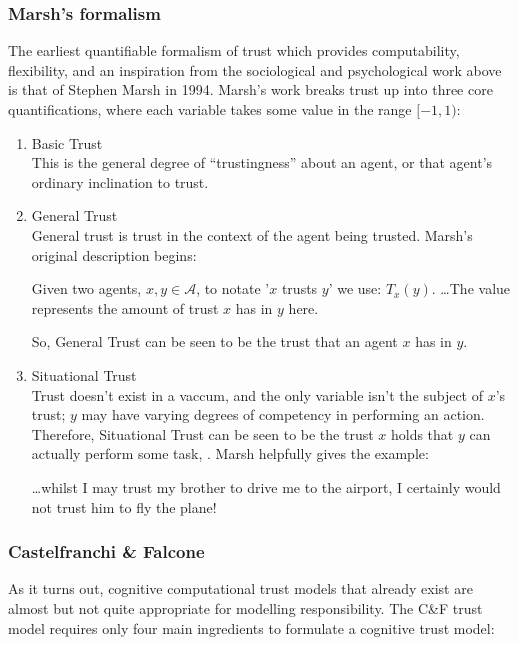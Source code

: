 \subsubsection{Marsh's formalism}
The earliest quantifiable formalism of trust which provides computability, flexibility, and an inspiration from the sociological and psychological work above is that of Stephen Marsh in 1994\cite{Marsh1994FormalisingConcept}. Marsh's work breaks trust up into three core quantifications, where each variable takes some value in the range \({[-1,1)}\):
\begin{enumerate}
    \item Basic Trust \\
    This is the general degree of ``trustingness'' about an agent, or that agent's ordinary inclination to trust.
    \item General Trust \\
    General trust is trust in the context of the agent being trusted. Marsh's original description begins\cite{Marsh1994FormalisingConcept}:
    \begin{displayquote}
        Given two agents, \(x, y \in \mathcal{A}\), to notate '\(x\) trusts \(y\)'  we use: \(T_{x}(y)\). {\ldots}The value represents the amount of trust \(x\) has in \(y\) here.
    \end{displayquote}
    So, General Trust can be seen to be the trust that an agent \(x\) has in \(y\).
    \item Situational Trust \\
    Trust doesn't exist in a vaccum, and the only variable isn't the subject of \(x\)'s trust; \(y\) may have varying degrees of competency in performing an action. Therefore, Situational Trust can be seen to be the trust \(x\) holds that \(y\) can actually perform some task, \safealpha. Marsh helpfully gives the example\cite{Marsh1994FormalisingConcept}:
    \begin{displayquote}
        {\ldots}whilst I may trust my brother to drive me to the airport, I certainly would not trust him to fly the plane!
    \end{displayquote}
\end{enumerate}

\subsubsection{Castelfranchi \& Falcone}
As it turns out, cognitive computational trust models that already exist are almost but not quite appropriate for modelling responsibility. The C\&F trust model requires only four main ingredients to formulate a cognitive trust model:

